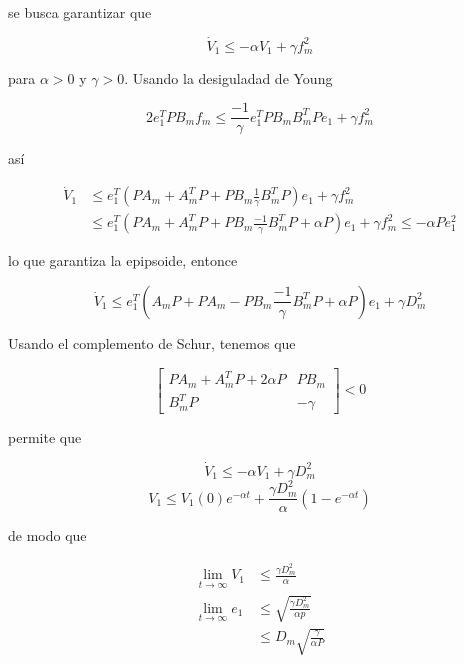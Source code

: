 se busca garantizar que 

\begin{equation*}
    \dot{V}_1 \leq -\alpha V_1 + \gamma f_m^2
\end{equation*}

para $\alpha>0$ y $\gamma>0$. Usando la desiguladad de Young

\begin{equation*}
    2e_1^TPB_mf_m \leq \frac{-1}{\gamma}e_1^TPB_mB_m^TPe_1 + \gamma f_m^2
\end{equation*}

así

\begin{equation*}
    \begin{aligned}
        \dot{V}_1 &\leq e_1^T(PA_m+A_m^TP+PB_m\frac{1}{\gamma}B_m^TP)e_1 + \gamma f_m^2\\
        & \leq e_1^T(PA_m+A_m^TP+PB_m\frac{-1}{\gamma}B_m^TP+\alpha P)e_1 + \gamma f_m^2 \leq -\alpha P e_1^2
    \end{aligned}
\end{equation*}

lo que garantiza la epipsoide, entonce

\begin{equation*}
    \dot{V}_1 \leq e_1^T(A_mP+PA_m - PB_m\frac{-1}{\gamma}B_m^TP+\alpha P)e_1 + \gamma D_m^2
\end{equation*}

Usando el complemento de Schur, tenemos que

\begin{equation*}
    \begin{bmatrix}
        PA_m+A_m^TP+2\alpha P &  PB_m\\
        B_m^TP & -\gamma 
    \end{bmatrix} < 0 
\end{equation*}

permite que 

\begin{equation*}
    \dot{V}_1 \leq -\alpha V_1 + \gamma D_m^2
\end{equation*}
 \begin{equation*}
    V_1  \leq V_1(0) e^{-\alpha t} + \frac{\gamma D_m^2}{\alpha}(1-e^{-\alpha t})
 \end{equation*}


 de modo que 

\begin{equation*}
    \begin{aligned}
        \lim_{t \to \infty} V_1 &\leq \frac{\gamma D_m^2}{\alpha} \\
        \lim_{t \to \infty} e_1 &\leq \sqrt{\frac{\gamma D_m^2}{\alpha p}} \\
                                &\leq D_m \sqrt{\frac{\gamma}{\alpha P}}
    \end{aligned}
\end{equation*}

